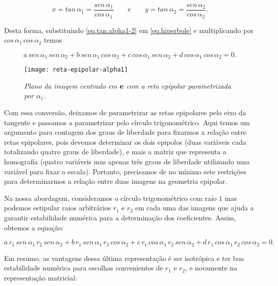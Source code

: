 \begin{equation}\label{eq.tan.alpha1-2}
x=tan\,\alpha_1=\frac{sen\,\alpha_1 }{cos\,\alpha_1} \qquad \text{e} \qquad y=tan\,\alpha_2=\frac{sen\,\alpha_2}{cos\,\alpha_2}.
\end{equation} 

Desta forma, substituindo \ref{eq.tan.alpha1-2} em \ref{eq.hiperbole} e multiplicando por $cos\,\alpha_1\,cos\,\alpha_2$ temos

\begin{equation*}
a\,sen\,\alpha_1\,sen\,\alpha_2+b\,sen\,\alpha_1\,cos\,\alpha_2+c\,cos\,\alpha_1\,sen\,\alpha_2+d\,cos\,\alpha_1\,cos\,\alpha_2=0.
\end{equation*}

\begin{figure}[!htb]
\centering
\texttt{[image: reta-epipolar-alpha1]}
\caption{\textit{Plano da imagem centrado em ${\bf e}$ com a reta epipolar parametrizada por $\alpha_1$.}}
\label{fig.reta-epipolar}
\end{figure}

Com essa conversão, deixamos de parametrizar as retas epipolares pelo eixo da tangente e passamos a parametrizar pelo círculo trigonométrico. Aqui temos um argumento para contagem dos graus de liberdade para fixarmos a relação entre retas epipolares, pois devemos determinar os dois epipolos (duas variáveis cada totalizando quatro graus de liberdade), e mais a matriz que representa a homografia (quatro variáveis mas apenas três graus de liberdade utilizando uma variável para fixar a escala). Portanto, precisamos de no mínimo sete restrições para determinarmos a relação entre duas imagens na geometria epipolar. 

Na nossa abordagem, consideramos o círculo trigonométrico com raio $1$ mas podemos estipular raios arbitrários $r_1$ e $r_2$ em cada uma das imagens que ajuda a garantir estabilidade numérica para a determinação dos coeficientes. Assim, obtemos a equação:

\begin{equation*}
a\,r_1\,sen\,\alpha_1\,r_2\,sen\,\alpha_2+b\,r_1\,sen\,\alpha_1\,r_2\,cos\,\alpha_2+c\,r_1\,cos\,\alpha_1\,r_2\,sen\,\alpha_2+d\,r_1\,cos\,\alpha_1\,r_2\,cos\,\alpha_2=0.
\end{equation*}

Em resumo, as vantagens dessa última representação é ser isotrópica e ter boa estabilidade numérica para escolhas convenientes de $r_1$ e $r_2$, e novamente  na representação matricial:

